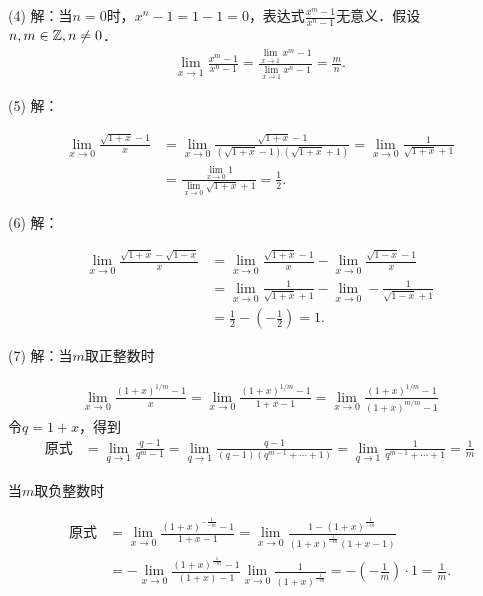 \noindent (4) 解：当$n=0$时，$x^n-1 = 1 - 1 = 0$，表达式$\displaystyle\frac{x^m-1}{x^n-1}$无意义．假设$n , m \in \mathbb{Z}, n \neq 0$．
\begin{align}
    \lim_{x \to 1} \frac{x^m-1}{x^n-1} = \frac{\displaystyle\lim_{x \to 1} x^m-1}{\displaystyle\lim_{x \to 1} x^n-1} = \frac{m}{n}.
\end{align}

\noindent (5) 解：

\begin{align}
    \lim_{x \to 0} \frac{\sqrt{1+x}-1}{x} &= \lim_{x \to 0} \frac{\sqrt{1+x} - 1}{(\sqrt{1+x} - 1)(\sqrt{1+x}+1)} = \lim_{x \to 0} \frac{1}{\sqrt{1+x}+1} \\
    &= \frac{\displaystyle\lim_{x \to 0} 1}{\displaystyle\lim_{x \to 0} \sqrt{1+x} + 1} = \frac{1}{2}.
\end{align}

\noindent (6) 解：

\begin{align}
    \lim_{x \to 0} \frac{\sqrt{1+x}-\sqrt{1-x}}{x} &= \lim_{x \to 0} \frac{\sqrt{1+x}-1}{x} - \lim_{x \to 0} \frac{\sqrt{1-x}-1}{x} \\
    &= \lim_{x \to 0} \frac{1}{\sqrt{1+x}+1} - \lim_{x \to 0} - \frac{1}{\sqrt{1-x}+1} \\
    &= \frac{1}{2} - (-\frac{1}{2}) = 1.
\end{align}

\noindent (7) 解：当$m$取正整数时

\begin{align}
    \lim_{x \to 0} \frac{(1+x)^{1/m}-1}{x} = \lim_{x \to 0} \frac{(1+x)^{1/m}-1}{1+x-1} = \lim_{x \to 0} \frac{(1+x)^{1/m}-1}{(1+x)^{m/m}-1}
\end{align}
令$q = 1+x$，得到
\begin{align}
    \text{原式} &= \lim_{q \to 1} \frac{q-1}{q^m-1} = \lim_{q \to 1} \frac{q-1}{(q-1)(q^{m-1}+\cdots+1)} = \lim_{q \to 1} \frac{1}{q^{m-1}+\cdots+1} = \frac{1}{m}
\end{align}

\noindent 当$m$取负整数时

\begin{align}
    \text{原式} &= \lim_{x \to 0} \frac{(1+x)^{-\displaystyle\frac{1}{-m}}-1}{1+x-1} = \lim_{x \to 0} \frac{1 - (1+x)^{\displaystyle\frac{1}{-m}}}{(1+x)^{\displaystyle\frac{1}{-m}} (1+x-1)} \\
    &= - \lim_{x \to 0} \frac{(1+x)^{\displaystyle\frac{1}{-m}}-1}{(1+x)-1} \lim_{x \to 0} \frac{1}{(1+x)^{\displaystyle\frac{1}{-m}}} = - \left( - \frac{1}{m} \right) \cdot 1 = \frac{1}{m}.
\end{align}

